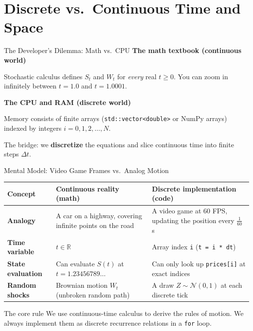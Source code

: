 \documentclass[aspectratio=169,11pt]{beamer}
\newcommand{\code}[1]{\texttt{#1}}
\begin{document}
\section{Discrete vs.\ Continuous Time and Space}

\begin{frame}{The Developer's Dilemma: Math vs.\ CPU}
  \textbf{The math textbook (continuous world)}

  Stochastic calculus defines $S_t$ and $W_t$ for \emph{every} real $t \ge 0$. You can zoom in infinitely between $t = 1.0$ and $t = 1.0001$.
  \medskip

  \textbf{The CPU and RAM (discrete world)}

  Memory consists of finite arrays (\code{std::vector<double>} or NumPy arrays) indexed by integers $i = 0, 1, 2, \dots, N$.
  \medskip

  \alert{The bridge:} we \textbf{discretize} the equations and slice continuous time into finite steps $\Delta t$.
\end{frame}

\begin{frame}{Mental Model: Video Game Frames vs.\ Analog Motion}
  \footnotesize
  \begin{tabularx}{\textwidth}{>{\bfseries}l Y Y}
    \toprule
    Concept & Continuous reality (math) & Discrete implementation (code) \\
    \midrule
    Analogy & A car on a highway, covering infinite points on the road & A video game at 60 FPS, updating the position every $\frac{1}{60}$ s \\
    Time variable & $t \in \mathbb{R}$ & Array index \code{i} (\code{t = i * dt}) \\
    State evaluation & Can evaluate $S(t)$ at $t = 1.23456789\dots$ & Can only look up \code{prices[i]} at exact indices \\
    Random shocks & Brownian motion $W_t$ (unbroken random path) & A draw $Z \sim \mathcal{N}(0,1)$ at each discrete tick \\
    \bottomrule
  \end{tabularx}
  \bigskip

  \begin{block}{The core rule}
    We use continuous-time calculus to derive the rules of motion. We always implement them as discrete recurrence relations in a \code{for} loop.
  \end{block}
\end{frame}
\end{document}
